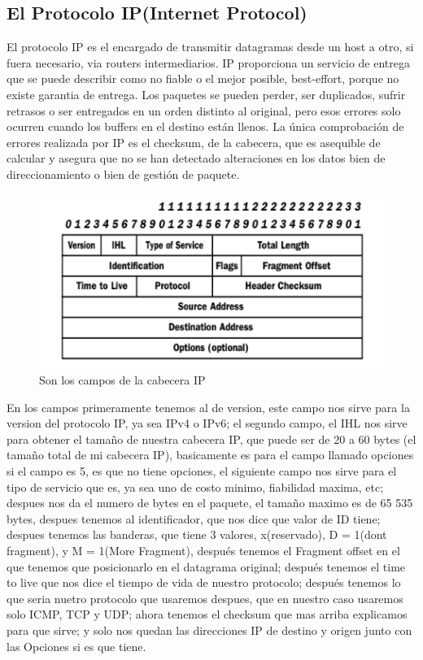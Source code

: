 	\subsection{El Protocolo IP(Internet Protocol)}
		El protocolo IP es el encargado de transmitir datagramas desde un host a otro, si fuera necesario, via routers intermediarios. IP proporciona un servicio de entrega que se puede describir como no fiable o el mejor posible, best-effort, porque no existe garantia de entrega. Los paquetes se pueden perder, ser duplicados, sufrir retrasos o ser entregados en un orden distinto al original, pero esos errores solo ocurren cuando los buffers en el destino est\'an llenos. La \'unica comprobaci\'on de errores realizada por IP es el checksum, de la cabecera, que es asequible de calcular y asegura que no se han detectado alteraciones en los datos bien de direccionamiento o bien de gesti\'on de paquete.
	\begin{figure}[h]
			\centering		
			\includegraphics[width=\textwidth]{CabeceraIP}
			\caption{Son los campos de la cabecera IP}
		\end{figure}
\vskip 1pt
En los campos primeramente tenemos al de version, este campo nos sirve para la version del protocolo IP, ya sea IPv4 o IPv6; el segundo campo, el IHL nos sirve para obtener el tama\~no de nuestra cabecera IP, que puede ser de 20 a 60 bytes (el tama\~no total de mi cabecera IP), basicamente es para el campo llamado opciones si el campo es 5, es que no tiene opciones, el siguiente campo nos sirve para el tipo de servicio que es, ya sea uno de costo minimo, fiabilidad maxima, etc; despues nos da el numero de bytes en el paquete, el tama\~no maximo es de 65 535 bytes, despues tenemos al identificador, que nos dice que valor de ID tiene; despues tenemos las banderas, que tiene 3 valores, x(reservado), D = 1(dont fragment), y M = 1(More Fragment), despu\'es tenemos el Fragment offset en el que tenemos que posicionarlo en el datagrama original; despu\'es tenemos el time to live que nos dice el tiempo de vida de nuestro protocolo; despu\'es tenemos lo que seria nuetro protocolo que usaremos despues, que en nuestro caso usaremos solo ICMP, TCP y UDP; ahora tenemos el checksum que mas arriba explicamos para que sirve; y solo nos quedan las direcciones IP de destino y origen junto con las Opciones si es que tiene.
